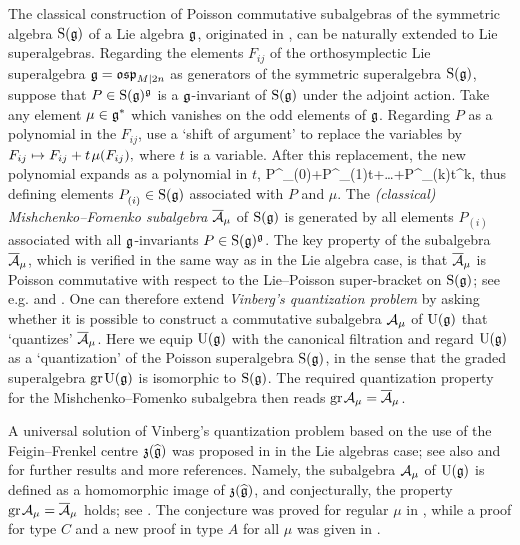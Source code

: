 \documentclass[12pt]{article}
\begin{document}
The classical construction of Poisson commutative subalgebras of the symmetric
algebra ${\rm S}(\mathfrak{g})$ of a Lie algebra $\mathfrak{g}$, originated in \cite{mf:ee}, can be naturally
extended to Lie superalgebras. Regarding the elements $F_{ij}$ of the
orthosymplectic Lie superalgebra $\mathfrak{g}=\mathfrak{osp}_{M|2n}$ as generators
of the symmetric superalgebra ${\rm S}(\mathfrak{g})$, suppose that $P\in{\rm S}(\mathfrak{g})^{\mathfrak{g}}$
is a $\mathfrak{g}$-invariant of ${\rm S}(\mathfrak{g})$ under the adjoint action.
Take any element $\mu\in\mathfrak{g}^*$ which
vanishes on the odd elements of $\mathfrak{g}$. Regarding $P$
as a polynomial in the $F_{ij}$, use a `shift of argument'
to replace the variables by
$
F_{ij}\mapsto F_{ij}+t\hspace{1pt} \mu(F_{ij}),
$
where $t$ is a variable. After this replacement, the new polynomial expands
as a polynomial in $t$,
P^{}_{(0)}+P^{}_{(1)}\tss t+\dots+P^{}_{(k)}\tss t^k,
\eeq
thus defining
elements $P^{}_{(i)}\in {\rm S}(\mathfrak{g})$ associated with $P$ and $\mu$.
The {\em (classical) Mishchenko--Fomenko subalgebra}
$\overline{{\mathcal A}}_{\mu}$ of ${\rm S}(\mathfrak{g})$
is generated by all elements $P^{}_{(i)}$
associated with all $\mathfrak{g}$-invariants $P\in {\rm S}(\mathfrak{g})^{\mathfrak{g}}$.
The key property of the subalgebra $\overline{{\mathcal A}}_{\mu}$, which is verified in the same way
as in the Lie algebra case, is that $\overline{{\mathcal A}}_{\mu}$ is Poisson commutative
with respect to the Lie--Poisson super-bracket on ${\rm S}(\mathfrak{g})$; see e.g. \cite{r:si}
and \cite[Sec.~9.1]{m:so}. One can therefore extend {\em Vinberg's quantization problem}
\cite{v:sc}
by asking whether it is possible to
construct a commutative
subalgebra ${\mathcal A}_{\mu}$ of ${\rm U}(\mathfrak{g})$ that `quantizes' $\overline{{\mathcal A}}_{\mu}$.
Here we equip ${\rm U}(\mathfrak{g})$ with the canonical filtration and
regard ${\rm U}(\mathfrak{g})$ as a `quantization'
of the Poisson superalgebra ${\rm S}(\mathfrak{g})$,
in the sense that the graded superalgebra ${\rm gr}\hspace{1pt}{\rm U}(\mathfrak{g})$
is isomorphic to ${\rm S}(\mathfrak{g})$. The required
quantization property for the Mishchenko--Fomenko subalgebra
then reads ${\rm gr}\hspace{1pt}{\mathcal A}_{\mu}=\overline{{\mathcal A}}_{\mu}$.

A universal solution of Vinberg's quantization problem
based on the use of the Feigin--Frenkel centre $\mathfrak{z}(\widehat{\mathfrak{g}})$ was
proposed in \cite{r:si} in the Lie algebras case; see also \cite{fft:gm} and
\cite[Ch.~9]{m:so} for further results and more references.
Namely, the subalgebra ${\mathcal A}_{\mu}$ of ${\rm U}(\mathfrak{g})$ is defined as a homomorphic image
of $\mathfrak{z}(\widehat{\mathfrak{g}})$, and conjecturally, the property ${\rm gr}\hspace{1pt}{\mathcal A}_{\mu}=\overline{{\mathcal A}}_{\mu}$
holds; see \cite[Conjecture~1]{fft:gm}. The conjecture was proved
for regular $\mu$ in \cite{fft:gm}, while a proof for type $C$ and
a new proof in type $A$
for all $\mu$ was given in \cite{my:qn}.
\end{document}
